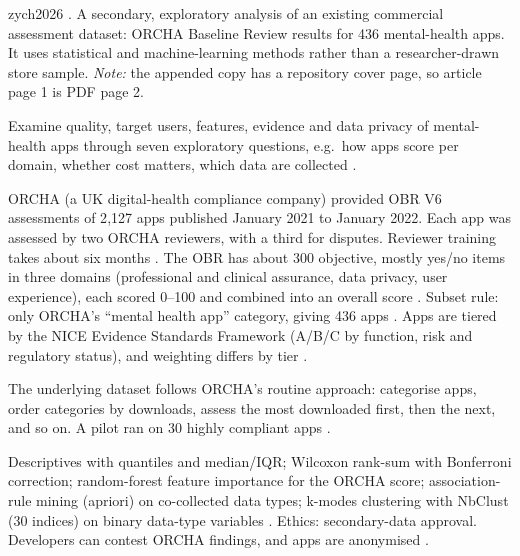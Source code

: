 \begin{papercard}{zych2026}
   . A secondary, exploratory analysis of an existing commercial assessment dataset: ORCHA Baseline Review results for 436 mental-health apps. It uses statistical and machine-learning methods rather than a researcher-drawn store sample. \emph{Note:} the appended copy has a repository cover page, so article page 1 is PDF page 2.

 Examine quality, target users, features, evidence and data privacy of mental-health apps through seven exploratory questions, e.g.\ how apps score per domain, whether cost matters, which data are collected .

 ORCHA (a UK digital-health compliance company) provided OBR V6 assessments of 2{,}127 apps published January 2021 to January 2022. Each app was assessed by two ORCHA reviewers, with a third for disputes. Reviewer training takes about six months . The OBR has about 300 objective, mostly yes/no items in three domains (professional and clinical assurance, data privacy, user experience), each scored 0--100 and combined into an overall score . Subset rule: only ORCHA's ``mental health app'' category, giving 436 apps . Apps are tiered by the NICE Evidence Standards Framework (A/B/C by function, risk and regulatory status), and weighting differs by tier .

 The underlying dataset follows ORCHA's routine approach: categorise apps, order categories by downloads, assess the most downloaded first, then the next, and so on. A pilot ran on 30 highly compliant apps .

 Descriptives with quantiles and median/IQR; Wilcoxon rank-sum with Bonferroni correction; random-forest feature importance for the ORCHA score; association-rule mining (apriori) on co-collected data types; k-modes clustering with NbClust (30 indices) on binary data-type variables . Ethics: secondary-data approval. Developers can contest ORCHA findings, and apps are anonymised .


\end{papercard}
